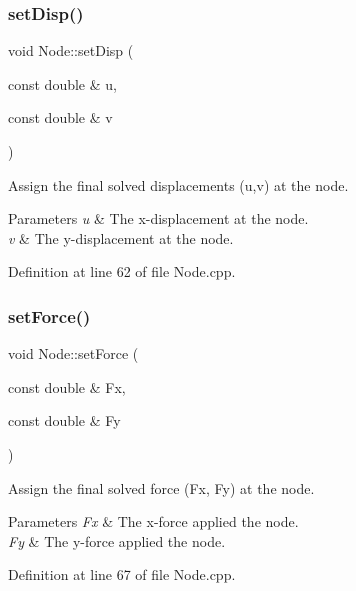 \subsubsection{\texorpdfstring{set\+Disp()}{setDisp()}}
{\footnotesize\ttfamily void Node\+::set\+Disp (\begin{DoxyParamCaption}\item[{const double \&}]{u,  }\item[{const double \&}]{v }\end{DoxyParamCaption})}



Assign the final solved displacements (u,v) at the node. 


\begin{DoxyParams}{Parameters}
{\em u} & The x-\/displacement at the node. \\
\hline
{\em v} & The y-\/displacement at the node. \\
\hline
\end{DoxyParams}


Definition at line 62 of file Node.\+cpp.

\mbox{\label{class_node_a261921c1143a8dfb7f7f7f454ce827e3}} 
\subsubsection{\texorpdfstring{set\+Force()}{setForce()}}
{\footnotesize\ttfamily void Node\+::set\+Force (\begin{DoxyParamCaption}\item[{const double \&}]{Fx,  }\item[{const double \&}]{Fy }\end{DoxyParamCaption})}



Assign the final solved force (Fx, Fy) at the node. 


\begin{DoxyParams}{Parameters}
{\em Fx} & The x-\/force applied the node. \\
\hline
{\em Fy} & The y-\/force applied the node. \\
\hline
\end{DoxyParams}


Definition at line 67 of file Node.\+cpp.

\mbox{\label{class_node_acea5ca0209b0c5cffa48d564320e4d56}} 
